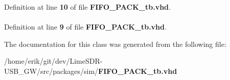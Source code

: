 Definition at line {\bf 10} of file {\bf F\+I\+F\+O\+\_\+\+P\+A\+C\+K\+\_\+tb.\+vhd}.

\paragraph[{std\+\_\+logic\+\_\+1164}]{\hspace{0.3cm}{\ttfamily [Package]}}\label{classFIFO__PACK__tb_acd03516902501cd1c7296a98e22c6fcb}


Definition at line {\bf 9} of file {\bf F\+I\+F\+O\+\_\+\+P\+A\+C\+K\+\_\+tb.\+vhd}.



The documentation for this class was generated from the following file\+:\begin{DoxyCompactItemize}
\item 
/home/erik/git/dev/\+Lime\+S\+D\+R-\/\+U\+S\+B\+\_\+\+G\+W/src/packages/sim/{\bf F\+I\+F\+O\+\_\+\+P\+A\+C\+K\+\_\+tb.\+vhd}\end{DoxyCompactItemize}
